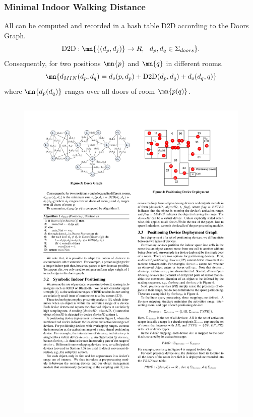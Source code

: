 \begin{frame}
\frametitle{Minimal Indoor Walking Distance}

All  can be computed and recorded in a hash table $\mathrm{D2D}$ according to the Doors Graph.
\pause
\begin{equation}
  \mathrm{D2D}: \mn{ \{ (d_p, d_j) \} \rightarrow R, ~~d_p, d_q \in \Sigma_{doors} }.
\end{equation}
\pause
Consequently, for two positions $\mn{p}$ and $\mn{q}$ in different rooms.
\pause
\begin{equation}
  \mn{d_{MIN}(d_p, d_q) = d_o(p, d_p) + \mathrm{D2D}(d_p, d_q) + d_o(d_q, q)}
\end{equation}
where $\mn{d_p(d_q)}$ ranges over all doors of room $\mn{p(q)}$.
\pause
\begin{columns}[c]

    \begin{figure}[tb]
      \includegraphics[width=\columnwidth]{figures/2-3/2-3-3.pdf}
    \end{figure}


\end{columns}

\end{frame}

